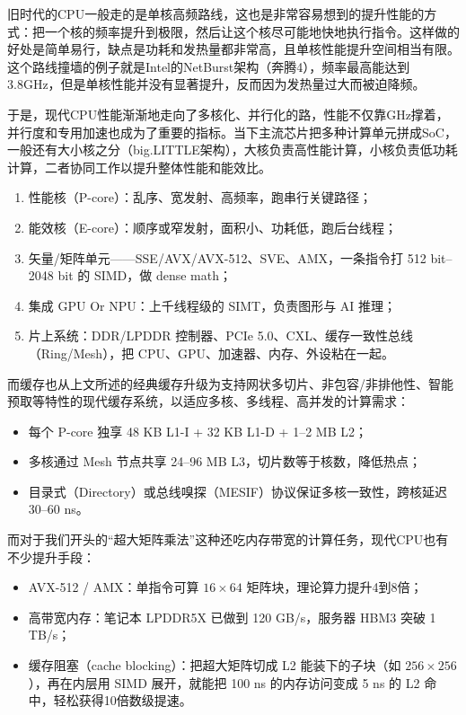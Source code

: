 旧时代的CPU一般走的是单核高频路线，这也是非常容易想到的提升性能的方式：把一个核的频率提升到极限，然后让这个核尽可能地快地执行指令。这样做的好处是简单易行，缺点是功耗和发热量都非常高，且单核性能提升空间相当有限。这个路线撞墙的例子就是Intel的NetBurst架构（奔腾4），频率最高能达到3.8GHz，但是单核性能并没有显著提升，反而因为发热量过大而被迫降频。

于是，现代CPU性能渐渐地走向了多核化、并行化的路，性能不仅靠GHz撑着，并行度和专用加速也成为了重要的指标。当下主流芯片把多种计算单元拼成SoC，一般还有大小核之分（big.LITTLE架构），大核负责高性能计算，小核负责低功耗计算，二者协同工作以提升整体性能和能效比。

\begin{enumerate}
\item 性能核（P-core）：乱序、宽发射、高频率，跑串行关键路径；
\item 能效核（E-core）：顺序或窄发射，面积小、功耗低，跑后台线程；
\item 矢量/矩阵单元——SSE/AVX/AVX-512、SVE、AMX，一条指令打 512 bit–2048 bit 的 SIMD，做 dense math；
\item 集成 GPU Or NPU：上千线程级的 SIMT，负责图形与 AI 推理；
\item 片上系统：DDR/LPDDR 控制器、PCIe 5.0、CXL、缓存一致性总线（Ring/Mesh），把 CPU、GPU、加速器、内存、外设粘在一起。
\end{enumerate}

而缓存也从上文所述的经典缓存升级为支持网状多切片、非包容/非排他性、智能预取等特性的现代缓存系统，以适应多核、多线程、高并发的计算需求：

\begin{itemize}
\item 每个 P-core 独享 48 KB L1-I + 32 KB L1-D + 1–2 MB L2；
\item 多核通过 Mesh 节点共享 24–96 MB L3，切片数等于核数，降低热点；
\item 目录式（Directory）或总线嗅探（MESIF）协议保证多核一致性，跨核延迟 30–60 ns。
\end{itemize}

而对于我们开头的“超大矩阵乘法”这种还吃内存带宽的计算任务，现代CPU也有不少提升手段：

\begin{itemize}
\item AVX-512 / AMX：单指令可算 $16\times 64$ 矩阵块，理论算力提升4到8倍；
\item 高带宽内存：笔记本 LPDDR5X 已做到 120 GB/s，服务器 HBM3 突破 1 TB/s；
\item 缓存阻塞（cache blocking）：把超大矩阵切成 L2 能装下的子块（如 $256 \times 256$），再在内层用 SIMD 展开，就能把 100 ns 的内存访问变成 5 ns 的 L2 命中，轻松获得10倍数级提速。
\end{itemize}

